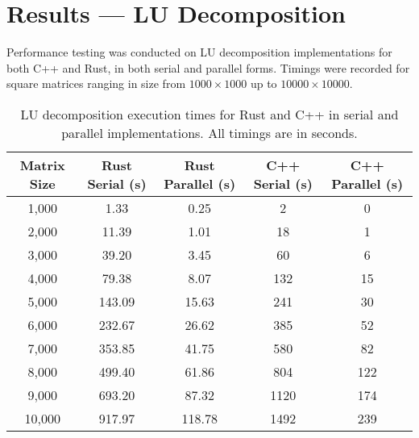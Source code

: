 \documentclass[12pt]{article}
\begin{document}
\section{Results --- LU Decomposition}

Performance testing was conducted on LU decomposition implementations for both C++ and Rust, in both serial and parallel forms. Timings were recorded for square matrices ranging in size from \(1000 \times 1000\) up to \(10000 \times 10000\).

\begin{table}[H]
    \centering
    \begin{tabular}{|c|c|c|c|c|}
        \hline
        \textbf{Matrix Size} & \textbf{Rust Serial (s)} & \textbf{Rust Parallel (s)} & \textbf{C++ Serial (s)} & \textbf{C++ Parallel (s)} \\
        \hline
        1,000                & 1.33                     & 0.25                       & 2                       & 0                         \\
        2,000                & 11.39                    & 1.01                       & 18                      & 1                         \\
        3,000                & 39.20                    & 3.45                       & 60                      & 6                         \\
        4,000                & 79.38                    & 8.07                       & 132                     & 15                        \\
        5,000                & 143.09                   & 15.63                      & 241                     & 30                        \\
        6,000                & 232.67                   & 26.62                      & 385                     & 52                        \\
        7,000                & 353.85                   & 41.75                      & 580                     & 82                        \\
        8,000                & 499.40                   & 61.86                      & 804                     & 122                       \\
        9,000                & 693.20                   & 87.32                      & 1120                    & 174                       \\
        10,000               & 917.97                   & 118.78                     & 1492                    & 239                       \\
        \hline
    \end{tabular}
    \caption{LU decomposition execution times for Rust and C++ in serial and parallel implementations. All timings are in seconds.}
    \label{tab:lu-timings}
\end{table}
\end{document}
